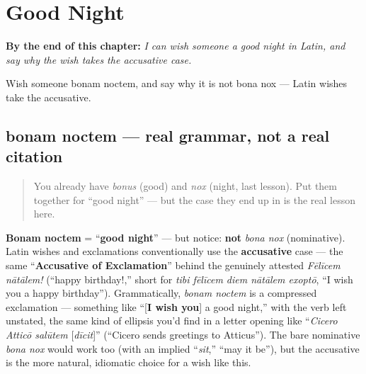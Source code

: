 
\chapter{Good Night}
\label{ch:la-good-night}

\begin{chapteropening}
\textbf{By the end of this chapter:} \emph{I can wish someone a good night in Latin, and say why the wish takes the accusative case.}

Wish someone bonam noctem, and say why it is not bona nox — Latin wishes take the accusative.
\end{chapteropening}

\section[bonam noctem]{bonam noctem — real grammar, not a real citation}

\label{lesson:LA-C30-bonam-noctem}



\begin{quote}
You already have \emph{bonus} (good) and \emph{nox} (night, last lesson). Put them together for \textquotedblleft{}good night\textquotedblright{} — but the case they end up in is the real lesson here.
\end{quote}

\begin{grammarlens}[title={Grammar Lens: bonam noctem — why accusative, not nominative}]
\textbf{Bonam noctem} = \textquotedblleft{}\textbf{good night}\textquotedblright{} — but notice: \textbf{not} \emph{bona nox} (nominative). Latin wishes and exclamations conventionally use the \textbf{accusative} case — the same \textquotedblleft{}\textbf{Accusative of Exclamation}\textquotedblright{} behind the genuinely attested \emph{Fēlīcem nātālem!} (\textquotedblleft{}happy birthday!,\textquotedblright{} short for \emph{tibi fēlīcem diem nātālem exoptō}, \textquotedblleft{}I wish you a happy birthday\textquotedblright{}). Grammatically, \emph{bonam noctem} is a compressed exclamation — something like \textquotedblleft{}{[}\textbf{I wish you}{]} a good night,\textquotedblright{} with the verb left unstated, the same kind of ellipsis you'd find in a letter opening like \textquotedblleft{}\emph{Cicero Atticō salūtem} {[}\emph{dīcit}{]}\textquotedblright{} (\textquotedblleft{}Cicero sends greetings to Atticus\textquotedblright{}). The bare nominative \emph{bona nox} would work too (with an implied \textquotedblleft{}\emph{sit},\textquotedblright{} \textquotedblleft{}may it be\textquotedblright{}), but the accusative is the more natural, idiomatic choice for a wish like this.
\end{grammarlens}

